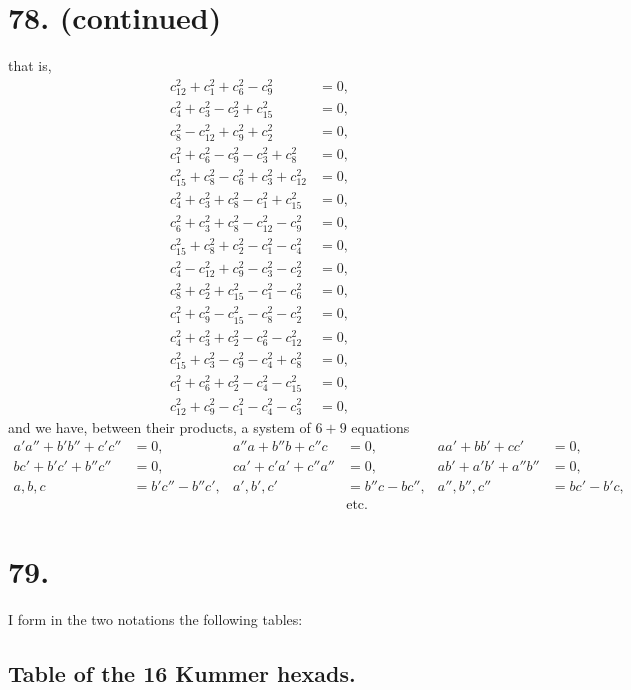 \documentclass[11pt,a4paper]{book}
\begin{document}
\newpage
\section*{78. (continued)}
\label{sec:78cont}

that is,
\begin{align*}
c_{12}^2 + c_1^2 + c_6^2 - c_9^2 &= 0, \\
c_4^2 + c_3^2 - c_2^2 + c_{15}^2 &= 0, \\
c_8^2 - c_{12}^2 + c_9^2 + c_2^2 &= 0, \\
c_1^2 + c_6^2 - c_9^2 - c_3^2 + c_8^2 &= 0, \\
c_{15}^2 + c_8^2 - c_6^2 + c_3^2 + c_{12}^2 &= 0, \\
c_4^2 + c_3^2 + c_8^2 - c_1^2 + c_{15}^2 &= 0, \\
c_6^2 + c_3^2 + c_8^2 - c_{12}^2 - c_9^2 &= 0, \\
c_{15}^2 + c_8^2 + c_2^2 - c_1^2 - c_4^2 &= 0, \\
c_4^2 - c_{12}^2 + c_9^2 - c_3^2 - c_2^2 &= 0, \\
c_8^2 + c_2^2 + c_{15}^2 - c_1^2 - c_6^2 &= 0, \\
c_1^2 + c_9^2 - c_{15}^2 - c_8^2 - c_2^2 &= 0, \\
c_4^2 + c_3^2 + c_2^2 - c_6^2 - c_{12}^2 &= 0, \\
c_{15}^2 + c_3^2 - c_9^2 - c_4^2 + c_8^2 &= 0, \\
c_1^2 + c_6^2 + c_2^2 - c_4^2 - c_{15}^2 &= 0, \\
c_{12}^2 + c_9^2 - c_1^2 - c_4^2 - c_3^2 &= 0,
\end{align*}
and we have, between their products, a system of $6+9$ equations
\begin{align*}
a'a'' + b'b'' + c'c'' &= 0, & a''a + b''b + c''c &= 0, & aa' + bb' + cc' &= 0, \\
bc' + b'c' + b''c'' &= 0, & ca' + c'a' + c''a'' &= 0, & ab' + a'b' + a''b'' &= 0, \\
a,b,c &= b'c'' - b''c', & a',b',c' &= b''c - bc'', & a'',b'',c'' &= bc' - b'c, \\
& & & \text{etc.}
\end{align*}

\newpage
\section*{79.}
\label{sec:79}

I form in the two notations the following tables:

\subsection*{Table of the 16 Kummer hexads.}
\end{document}
